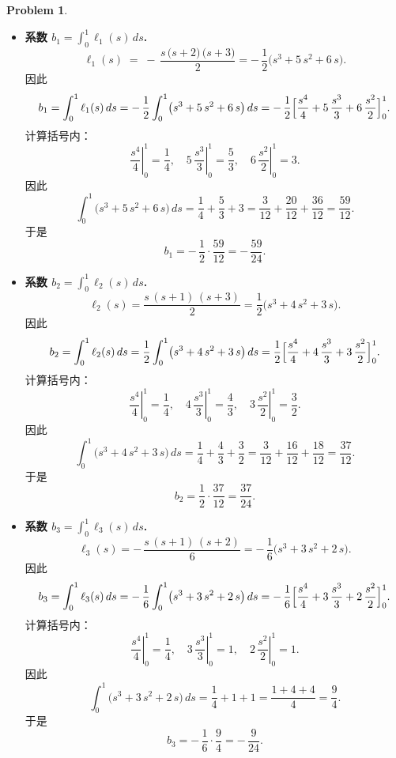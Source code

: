 \documentclass[a4paper]{article}
\theoremstyle{definition}
\newtheorem{problem}{Problem}
\theoremstyle{plain}
\newcommand{\<}{\left<}
\renewcommand{\>}{\right>}
\numberwithin{equation}{problem}
\begin{document}
\begin{problem}
\begin{itemize}
  \item \textbf{系数 $b_1 = \displaystyle\int_{0}^{1} \ell_1(s)\,ds$.}  
    \[
    \ell_1(s) \;=\; -\,\frac{s\,\bigl(s + 2\bigr)\,\bigl(s + 3\bigr)}{2}
    = -\,\frac{1}{2}\bigl(s^3 + 5\,s^2 + 6\,s\bigr).
    \]
    因此
    \[
    b_1 
    = \int_{0}^{1} \ell_1(s)\,ds
    = -\,\frac{1}{2} \int_{0}^{1} \bigl(s^3 + 5\,s^2 + 6\,s\bigr)\,ds
    = -\,\frac{1}{2} \Bigl[
      \frac{s^4}{4} + 5\,\frac{s^3}{3} + 6\,\frac{s^2}{2}
    \Bigr]_{0}^{1}.
    \]
    计算括号内：
    \[
    \left.\frac{s^4}{4}\right|_{0}^{1} = \frac{1}{4},\quad
    \left.5\,\frac{s^3}{3}\right|_{0}^{1} = \frac{5}{3},\quad
    \left.6\,\frac{s^2}{2}\right|_{0}^{1} = 3.
    \]
    因此
    \[
    \int_{0}^{1} \bigl(s^3 + 5\,s^2 + 6\,s\bigr)\,ds 
    = \frac{1}{4} + \frac{5}{3} + 3 
    = \frac{3}{12} + \frac{20}{12} + \frac{36}{12} 
    = \frac{59}{12}.
    \]
    于是
    \[
    b_1 = -\,\frac{1}{2} \cdot \frac{59}{12} 
    = -\,\frac{59}{24}.
    \]

  \item \textbf{系数 $b_2 = \displaystyle\int_{0}^{1} \ell_2(s)\,ds$.}  
    \[
    \ell_2(s) 
    = \frac{s\,(s + 1)\,(s + 3)}{2} 
    = \frac{1}{2}\bigl(s^3 + 4\,s^2 + 3\,s\bigr).
    \]
    因此
    \[
    b_2 
    = \int_{0}^{1} \ell_2(s)\,ds
    = \frac{1}{2} \int_{0}^{1} \bigl(s^3 + 4\,s^2 + 3\,s\bigr)\,ds
    = \frac{1}{2} \Bigl[
      \frac{s^4}{4} + 4\,\frac{s^3}{3} + 3\,\frac{s^2}{2}
    \Bigr]_{0}^{1}.
    \]
    计算括号内：
    \[
    \left.\frac{s^4}{4}\right|_{0}^{1} = \frac{1}{4},\quad
    \left.4\,\frac{s^3}{3}\right|_{0}^{1} = \frac{4}{3},\quad
    \left.3\,\frac{s^2}{2}\right|_{0}^{1} = \frac{3}{2}.
    \]
    因此
    \[
    \int_{0}^{1} \bigl(s^3 + 4\,s^2 + 3\,s\bigr)\,ds 
    = \frac{1}{4} + \frac{4}{3} + \frac{3}{2} 
    = \frac{3}{12} + \frac{16}{12} + \frac{18}{12} 
    = \frac{37}{12}.
    \]
    于是
    \[
    b_2 = \frac{1}{2} \cdot \frac{37}{12} 
    = \frac{37}{24}.
    \]

  \item \textbf{系数 $b_3 = \displaystyle\int_{0}^{1} \ell_3(s)\,ds$.}  
    \[
    \ell_3(s) 
    = -\,\frac{s\,(s + 1)\,(s + 2)}{6} 
    = -\,\frac{1}{6}\bigl(s^3 + 3\,s^2 + 2\,s\bigr).
    \]
    因此
    \[
    b_3 
    = \int_{0}^{1} \ell_3(s)\,ds
    = -\,\frac{1}{6} \int_{0}^{1} \bigl(s^3 + 3\,s^2 + 2\,s\bigr)\,ds
    = -\,\frac{1}{6} \Bigl[
      \frac{s^4}{4} + 3\,\frac{s^3}{3} + 2\,\frac{s^2}{2}
    \Bigr]_{0}^{1}.
    \]
    计算括号内：
    \[
    \left.\frac{s^4}{4}\right|_{0}^{1} = \frac{1}{4},\quad
    \left.3\,\frac{s^3}{3}\right|_{0}^{1} = 1,\quad
    \left.2\,\frac{s^2}{2}\right|_{0}^{1} = 1.
    \]
    因此
    \[
    \int_{0}^{1} \bigl(s^3 + 3\,s^2 + 2\,s\bigr)\,ds 
    = \frac{1}{4} + 1 + 1 
    = \frac{1 + 4 + 4}{4} 
    = \frac{9}{4}.
    \]
    于是
    \[
    b_3 = -\,\frac{1}{6} \cdot \frac{9}{4} 
    = -\,\frac{9}{24}.
    \]
\end{itemize}


\end{problem}
\end{document}
